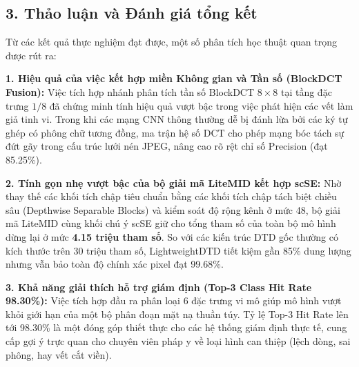 \subsection{3. Thảo luận và Đánh giá tổng kết}

\indent\indent Từ các kết quả thực nghiệm đạt được, một số phân tích học thuật quan trọng được rút ra:\vspace{0.3cm}

\textbf{1. Hiệu quả của việc kết hợp miền Không gian và Tần số (BlockDCT Fusion):}
Việc tích hợp nhánh phân tích tần số BlockDCT $8 \times 8$ tại tầng đặc trưng $1/8$ đã chứng minh tính hiệu quả vượt bậc trong việc phát hiện các vết làm giả tinh vi. Trong khi các mạng CNN thông thường dễ bị đánh lừa bởi các ký tự ghép có phông chữ tương đồng, ma trận hệ số DCT cho phép mạng bóc tách sự đứt gãy trong cấu trúc lưới nén JPEG, nâng cao rõ rệt chỉ số Precision (đạt 85.25\%).\vspace{0.3cm}

\textbf{2. Tính gọn nhẹ vượt bậc của bộ giải mã LiteMID kết hợp scSE:}
Nhờ thay thế các khối tích chập tiêu chuẩn bằng các khối tích chập tách biệt chiều sâu (Depthwise Separable Blocks) và kiểm soát độ rộng kênh ở mức 48, bộ giải mã LiteMID cùng khối chú ý scSE giữ cho tổng tham số của toàn bộ mô hình dừng lại ở mức \textbf{4.15 triệu tham số}. So với các kiến trúc DTD gốc thường có kích thước trên 30 triệu tham số, LightweightDTD tiết kiệm gần 85\% dung lượng nhưng vẫn bảo toàn độ chính xác pixel đạt 99.68\%.\vspace{0.3cm}

\textbf{3. Khả năng giải thích hỗ trợ giám định (Top-3 Class Hit Rate 98.30\%):}
Việc tích hợp đầu ra phân loại 6 đặc trưng vi mô giúp mô hình vượt khỏi giới hạn của một bộ phân đoạn mặt nạ thuần túy. Tỷ lệ Top-3 Hit Rate lên tới 98.30\% là một đóng góp thiết thực cho các hệ thống giám định thực tế, cung cấp gợi ý trực quan cho chuyên viên pháp y về loại hình can thiệp (lệch dòng, sai phông, hay vết cắt viền).

